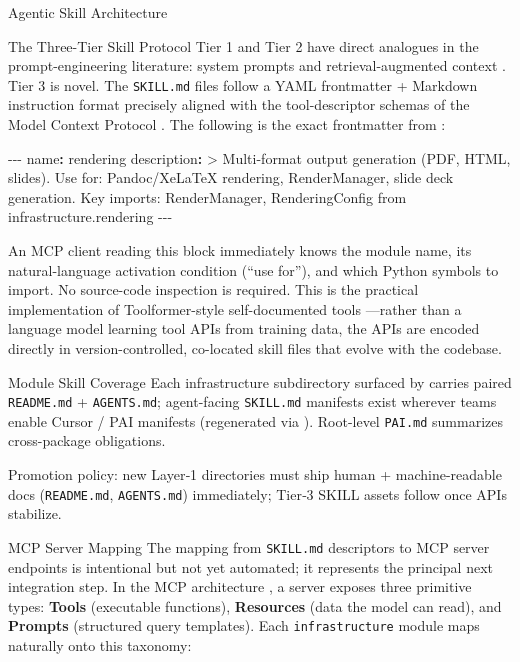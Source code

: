 \documentclass[
  ignorenonframetext,
]{beamer}
\newenvironment{Shaded}{}{}
\newcommand{\AttributeTok}[1]{\textcolor[rgb]{0.49,0.56,0.16}{#1}}
\newcommand{\CharTok}[1]{\textcolor[rgb]{0.25,0.44,0.63}{#1}}
\newcommand{\FunctionTok}[1]{\textcolor[rgb]{0.02,0.16,0.49}{#1}}
\newcommand{\KeywordTok}[1]{\textcolor[rgb]{0.00,0.44,0.13}{\textbf{#1}}}
\newcommand{\NormalTok}[1]{#1}
\newcommand{\PreprocessorTok}[1]{\textcolor[rgb]{0.74,0.48,0.00}{#1}}
\begin{document}
\begin{frame}{Agentic Skill Architecture}
\begin{block}{The Three-Tier Skill Protocol}
Tier 1 and Tier 2 have direct analogues in the prompt-engineering
literature: system prompts and retrieval-augmented context
. Tier 3 is novel. The \texttt{SKILL.md} files
follow a YAML frontmatter + Markdown instruction format precisely
aligned with the tool-descriptor schemas of the Model Context Protocol
. The following is the exact frontmatter from
:

\begin{Shaded}
\begin{Highlighting}[]
\PreprocessorTok{{-}{-}{-}}
\FunctionTok{name}\KeywordTok{:}\AttributeTok{ rendering}
\FunctionTok{description}\KeywordTok{: }\CharTok{\textgreater{}}
\NormalTok{  Multi{-}format output generation (PDF, HTML, slides).}
\NormalTok{  Use for: Pandoc/XeLaTeX rendering, RenderManager, slide deck generation.}
\NormalTok{  Key imports: RenderManager, RenderingConfig from infrastructure.rendering}
\PreprocessorTok{{-}{-}{-}}
\end{Highlighting}
\end{Shaded}

An MCP client reading this block immediately knows the module name, its
natural-language activation condition (``use for''), and which Python
symbols to import. No source-code inspection is required. This is the
practical implementation of Toolformer-style self-documented tools
---rather than a language model learning tool
APIs from training data, the APIs are encoded directly in
version-controlled, co-located skill files that evolve with the
codebase.
\end{block}

\begin{block}{Module Skill Coverage}
\protect{}\label{module-skill-coverage}
Each infrastructure subdirectory surfaced by
 carries paired
\texttt{README.md} + \texttt{AGENTS.md}; agent-facing \texttt{SKILL.md}
manifests exist wherever teams enable Cursor / PAI manifests
(regenerated via ). Root-level
\texttt{PAI.md} summarizes cross-package obligations.

Promotion policy: new Layer‑1 directories must ship human +
machine-readable docs (\texttt{README.md}, \texttt{AGENTS.md})
immediately; Tier‑3 SKILL assets follow once APIs stabilize.
\end{block}

\begin{block}{MCP Server Mapping}
\protect{}\label{mcp-server-mapping}
The mapping from \texttt{SKILL.md} descriptors to MCP server endpoints
is intentional but not yet automated; it represents the principal next
integration step. In the MCP architecture , a
server exposes three primitive types: \textbf{Tools} (executable
functions), \textbf{Resources} (data the model can read), and
\textbf{Prompts} (structured query templates). Each
\texttt{infrastructure} module maps naturally onto this taxonomy:


\end{block}
\end{frame}
\end{document}
